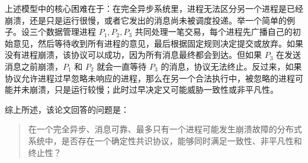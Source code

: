 上述模型中的核心困难在于：在完全异步系统里，进程无法区分另一个进程是已经崩溃，还是只是运行很慢，或者它发出的消息尚未被调度投递。举一个简单的例子。设三个数据管理进程 $P_1,P_2,P_3$ 共同处理一笔交易，每个进程先广播自己的初始意见，然后等待收到所有进程的意见，最后根据固定规则决定提交或放弃。如果没有进程崩溃，该协议可以成功，因为所有消息最终都会到达。但如果 $P_3$ 在发送消息之前崩溃，$P_1$ 和 $P_2$ 就会一直等待 $P_3$ 的消息，协议无法终止。反过来，如果协议允许进程过早忽略未响应的进程，那么在另一个合法执行中，被忽略的进程可能并未崩溃，只是运行较慢；此时过早决定又可能威胁一致性或非平凡性。

综上所述，该论文回答的问题是：

\begin{quote}
在一个完全异步、消息可靠、最多只有一个进程可能发生崩溃故障的分布式系统中，是否存在一个确定性共识协议，能够同时满足一致性、非平凡性和终止性？
\end{quote}
